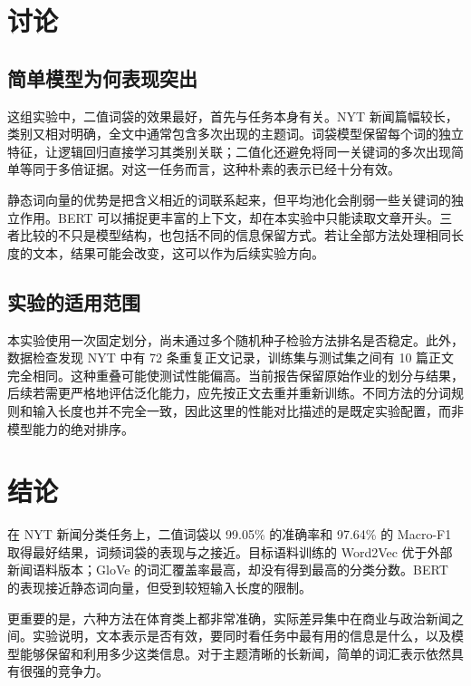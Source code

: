 \documentclass[11pt]{article}
\begin{document}
\section{讨论}

\subsection{简单模型为何表现突出}

这组实验中，二值词袋的效果最好，首先与任务本身有关。NYT 新闻篇幅较长，类别又相对明确，全文中通常包含多次出现的主题词。词袋模型保留每个词的独立特征，让逻辑回归直接学习其类别关联；二值化还避免将同一关键词的多次出现简单等同于多倍证据。对这一任务而言，这种朴素的表示已经十分有效。

静态词向量的优势是把含义相近的词联系起来，但平均池化会削弱一些关键词的独立作用。BERT 可以捕捉更丰富的上下文，却在本实验中只能读取文章开头。三者比较的不只是模型结构，也包括不同的信息保留方式。若让全部方法处理相同长度的文本，结果可能会改变，这可以作为后续实验方向。

\subsection{实验的适用范围}

本实验使用一次固定划分，尚未通过多个随机种子检验方法排名是否稳定。此外，数据检查发现 NYT 中有 72 条重复正文记录，训练集与测试集之间有 10 篇正文完全相同。这种重叠可能使测试性能偏高。当前报告保留原始作业的划分与结果，后续若需更严格地评估泛化能力，应先按正文去重并重新训练。不同方法的分词规则和输入长度也并不完全一致，因此这里的性能对比描述的是既定实验配置，而非模型能力的绝对排序。

\section{结论}

在 NYT 新闻分类任务上，二值词袋以 99.05\% 的准确率和 97.64\% 的 Macro-F1 取得最好结果，词频词袋的表现与之接近。目标语料训练的 Word2Vec 优于外部新闻语料版本；GloVe 的词汇覆盖率最高，却没有得到最高的分类分数。BERT 的表现接近静态词向量，但受到较短输入长度的限制。

更重要的是，六种方法在体育类上都非常准确，实际差异集中在商业与政治新闻之间。实验说明，文本表示是否有效，要同时看任务中最有用的信息是什么，以及模型能够保留和利用多少这类信息。对于主题清晰的长新闻，简单的词汇表示依然具有很强的竞争力。


\end{document}
